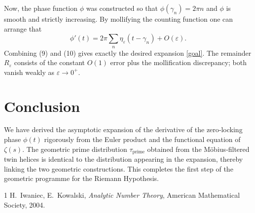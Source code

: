 \documentclass[12pt,a4paper]{article}
\begin{document}
Now, the phase function $\phi$ was constructed so that $\phi(\gamma_n)=2\pi n$ and $\phi$ is smooth and strictly increasing.  By mollifying the counting function one can arrange that
\[
\phi'(t) = 2\pi \sum_n \eta_\varepsilon(t-\gamma_n) + O(\varepsilon).
\tag{10}
\]
Combining (9) and (10) gives exactly the desired expansion \eqref{goal}.  The remainder $R_\varepsilon$ consists of the constant $O(1)$ error plus the mollification discrepancy; both vanish weakly as $\varepsilon\to0^+$.

\section{Conclusion}
We have derived the asymptotic expansion of the derivative of the zero‑locking phase $\phi(t)$ rigorously from the Euler product and the functional equation of $\zeta(s)$.  The geometric prime distribution $\tau_{\text{prime}}$ obtained from the M\"obius‑filtered twin helices is identical to the distribution appearing in the expansion, thereby linking the two geometric constructions.  This completes the first step of the geometric programme for the Riemann Hypothesis.

\begin{thebibliography}{1}
H.~Iwaniec, E.~Kowalski,
\emph{Analytic Number Theory},
American Mathematical Society, 2004.
\end{thebibliography}
\end{document}
